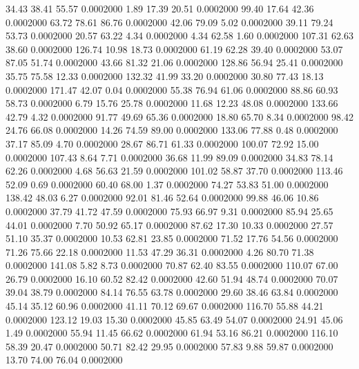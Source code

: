   34.43   38.41   55.57   0.0002000
   1.89   17.39   20.51   0.0002000
  99.40   17.64   42.36   0.0002000
  63.72   78.61   86.76   0.0002000
  42.06   79.09    5.02   0.0002000
  39.11   79.24   53.73   0.0002000
  20.57   63.22    4.34   0.0002000
   4.34   62.58    1.60   0.0002000
 107.31   62.63   38.60   0.0002000
 126.74   10.98   18.73   0.0002000
  61.19   62.28   39.40   0.0002000
  53.07   87.05   51.74   0.0002000
  43.66   81.32   21.06   0.0002000
 128.86   56.94   25.41   0.0002000
  35.75   75.58   12.33   0.0002000
 132.32   41.99   33.20   0.0002000
  30.80   77.43   18.13   0.0002000
 171.47   42.07    0.04   0.0002000
  55.38   76.94   61.06   0.0002000
  88.86   60.93   58.73   0.0002000
   6.79   15.76   25.78   0.0002000
  11.68   12.23   48.08   0.0002000
 133.66   42.79    4.32   0.0002000
  91.77   49.69   65.36   0.0002000
  18.80   65.70    8.34   0.0002000
  98.42   24.76   66.08   0.0002000
  14.26   74.59   89.00   0.0002000
 133.06   77.88    0.48   0.0002000
  37.17   85.09    4.70   0.0002000
  28.67   86.71   61.33   0.0002000
 100.07   72.92   15.00   0.0002000
 107.43    8.64    7.71   0.0002000
  36.68   11.99   89.09   0.0002000
  34.83   78.14   62.26   0.0002000
   4.68   56.63   21.59   0.0002000
 101.02   58.87   37.70   0.0002000
 113.46   52.09    0.69   0.0002000
  60.40   68.00    1.37   0.0002000
  74.27   53.83   51.00   0.0002000
 138.42   48.03    6.27   0.0002000
  92.01   81.46   52.64   0.0002000
  99.88   46.06   10.86   0.0002000
  37.79   41.72   47.59   0.0002000
  75.93   66.97    9.31   0.0002000
  85.94   25.65   44.01   0.0002000
   7.70   50.92   65.17   0.0002000
  87.62   17.30   10.33   0.0002000
  27.57   51.10   35.37   0.0002000
  10.53   62.81   23.85   0.0002000
  71.52   17.76   54.56   0.0002000
  71.26   75.66   22.18   0.0002000
  11.53   47.29   36.31   0.0002000
   4.26   80.70   71.38   0.0002000
 141.08    5.82    8.73   0.0002000
  70.87   62.40   83.55   0.0002000
 110.07   67.00   26.79   0.0002000
  16.10   60.52   82.42   0.0002000
  42.60   51.94   48.74   0.0002000
  70.07   39.04   38.79   0.0002000
  84.14   76.55   63.78   0.0002000
  29.60   38.46   63.84   0.0002000
  45.14   35.12   60.96   0.0002000
  41.11   70.12   69.67   0.0002000
 116.70   55.88   44.21   0.0002000
 123.12   19.03   15.30   0.0002000
  45.85   63.49   54.07   0.0002000
  24.91   45.06    1.49   0.0002000
  55.94   11.45   66.62   0.0002000
  61.94   53.16   86.21   0.0002000
 116.10   58.39   20.47   0.0002000
  50.71   82.42   29.95   0.0002000
  57.83    9.88   59.87   0.0002000
  13.70   74.00   76.04   0.0002000
